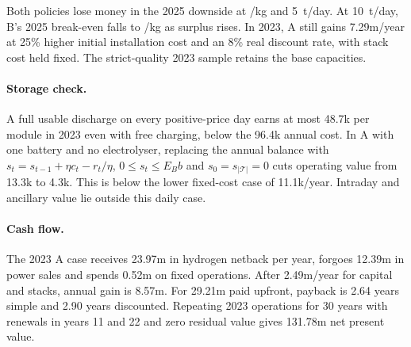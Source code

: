 Both policies lose money in the 2025 downside at /kg and 5~t/day.
At 10~t/day, B's 2025 break-even falls to /kg as surplus rises.
In 2023, A still gains \gbp 7.29m/year at 25\% higher initial installation
cost and an 8\% real discount rate, with stack cost held fixed. The
strict-quality 2023 sample retains the base capacities.

\paragraph{Storage check.}
A full usable discharge on every positive-price day earns at most
\gbp 48.7k per module in 2023 even with free charging, below the
\gbp 96.4k annual cost. In A with one battery and no electrolyser, replacing the annual
balance with \(s_t=s_{t-1}+\eta c_t-r_t/\eta\),
\(0\le s_t\le E_B b\) and \(s_0=s_{|\mathcal T|}=0\) cuts operating value from
\gbp 13.3k to \gbp 4.3k. This is below the lower fixed-cost case of
\gbp 11.1k/year. Intraday and ancillary value lie outside this daily case.

\paragraph{Cash flow.}
The 2023 A case receives \gbp 23.97m in hydrogen netback per year, forgoes
\gbp 12.39m in power sales and spends \gbp 0.52m on fixed operations.
After \gbp 2.49m/year for capital and stacks, annual gain is \gbp 8.57m.
For \gbp 29.21m paid upfront, payback is 2.64 years simple and 2.90 years
discounted. Repeating 2023 operations for 30 years with renewals in years
11 and 22 and zero residual value gives \gbp 131.78m net present value.
